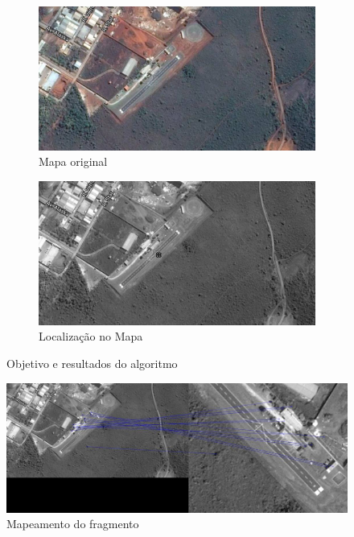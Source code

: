 \documentclass[]{beamer}
\begin{document}
\begin{frame}
\begin{figure}
\begin{subfigure}[b]{0.4\textwidth}
	\centering
	\includegraphics[width=\textwidth]{images/mapOriginal.png}
	\caption{Mapa original}
\end{subfigure}
\begin{subfigure}[b]{0.4\textwidth}
	\centering
	\includegraphics[width=\textwidth]{images/mapLocalized.png}
	\caption{Localização no Mapa}
\end{subfigure}
\caption{Objetivo e resultados do algoritmo}
\end{figure}
\end{frame}


\begin{frame}
\begin{figure}
\centering
\includegraphics[width=\textwidth]{images/mapMatching.png}
\caption{Mapeamento do fragmento}
\end{figure}
\end{frame}
\end{document}

